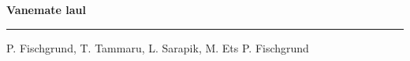 \documentclass[10pt]{book}
\begin{document}
{
  \samepage
  \raggedbottom
  \raggedright
  \sloppy


  \vspace{0.2in}

  \noindent\begin{minipage}{.1\textwidth}
    \hfill\vspace{0.1in}
  \end{minipage}%
  \noindent\begin{minipage}{.8\textwidth}
    \centering
    \bfseries
    \large Vanemate laul
  \end{minipage}%
  \noindent\begin{minipage}{.1\textwidth}
      \hfill\vspace{0.1in}
  \end{minipage}

  \nopagebreak[4]
  \vspace{0.1in}
  \nopagebreak[4]
  \hrule height 0.05ex
  \nopagebreak[4]
  \vspace{-0.05in}

  {\footnotesize P. Fischgrund, T. Tammaru, L. Sarapik, M. Ets \hfill P. Fischgrund }\\
  \vspace{0.01in}



}
\end{document}
